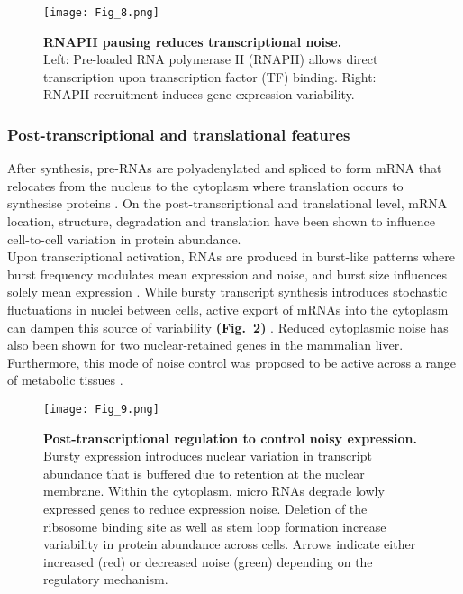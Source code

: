\begin{figure}[!h]
\centering
\texttt{[image: Fig\_8.png]}
\caption[RNAPII pausing reduces transcriptional noise]{\textbf{RNAPII pausing reduces transcriptional noise.}\\
Left: Pre-loaded RNA polymerase II (RNAPII) allows direct transcription upon transcription factor (TF) binding. 
Right: RNAPII recruitment induces gene expression variability.}
\label{fig0:RNAPII}
\end{figure} 

\newpage

\subsubsection{Post-transcriptional and translational features}

After synthesis, pre-RNAs are polyadenylated and spliced to form mRNA that relocates from the nucleus to the cytoplasm where translation occurs to synthesise proteins \cite{Glisovic2008}. 
On the post-transcriptional and translational level, mRNA location, structure, degradation and translation have been shown to influence cell-to-cell variation in protein abundance.\\

Upon transcriptional activation, RNAs are produced in burst-like patterns where burst frequency modulates mean expression and noise, and burst size influences solely mean expression \citep{Hornung2012}. 
While bursty transcript synthesis introduces stochastic fluctuations in nuclei between cells, active export of mRNAs into the cytoplasm can dampen this source of variability \textbf{(Fig.~\ref{fig0:posttranscriptional})} \citep{Battich2015a}. 
Reduced cytoplasmic noise has also been shown for two nuclear-retained genes in the mammalian liver. 
Furthermore, this mode of noise control was proposed to be active across a range of metabolic tissues \cite{BaharHalpern2015a}.\\

\begin{figure}[!h]
\centering
\texttt{[image: Fig\_9.png]}
\caption[Post-transcriptional regulation to control noisy expression]{\textbf{Post-transcriptional regulation to control noisy expression.}\\
Bursty expression introduces nuclear variation in transcript abundance that is buffered due to retention at the nuclear membrane. Within the cytoplasm, micro RNAs degrade lowly expressed genes to reduce expression noise. 
Deletion of the ribsosome binding site as well as stem loop formation increase variability in protein abundance across cells. 
Arrows indicate either increased (red) or decreased noise (green) depending on the regulatory mechanism.}
\label{fig0:posttranscriptional}
\end{figure} 

